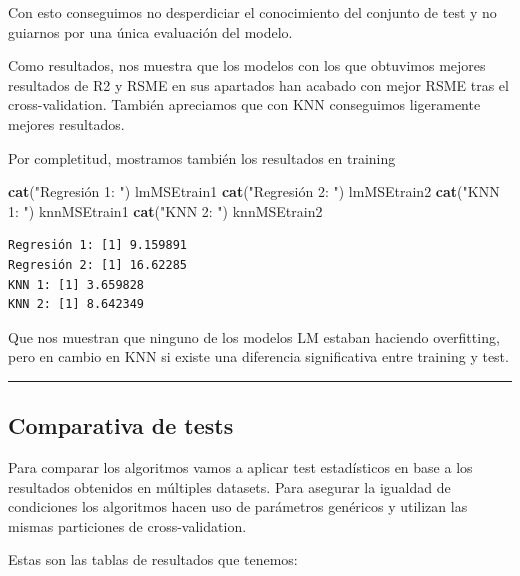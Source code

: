 \documentclass[
]{article}
\newenvironment{Shaded}{\begin{snugshade}}{\end{snugshade}}
\newcommand{\KeywordTok}[1]{\textcolor[rgb]{0.13,0.29,0.53}{\textbf{#1}}}
\newcommand{\NormalTok}[1]{#1}
\newcommand{\StringTok}[1]{\textcolor[rgb]{0.31,0.60,0.02}{#1}}
\begin{document}
Con esto conseguimos no desperdiciar el conocimiento del conjunto de
test y no guiarnos por una única evaluación del modelo.

Como resultados, nos muestra que los modelos con los que obtuvimos
mejores resultados de R2 y RSME en sus apartados han acabado con mejor
RSME tras el cross-validation. También apreciamos que con KNN
conseguimos ligeramente mejores resultados.

Por completitud, mostramos también los resultados en training

\begin{Shaded}
\begin{Highlighting}[]
\KeywordTok{cat}\NormalTok{(}\StringTok{"Regresión 1: "}\NormalTok{)}
\NormalTok{lmMSEtrain1}
\KeywordTok{cat}\NormalTok{(}\StringTok{"Regresión 2: "}\NormalTok{)}
\NormalTok{lmMSEtrain2}
\KeywordTok{cat}\NormalTok{(}\StringTok{"KNN 1: "}\NormalTok{)}
\NormalTok{knnMSEtrain1}
\KeywordTok{cat}\NormalTok{(}\StringTok{"KNN 2: "}\NormalTok{)}
\NormalTok{knnMSEtrain2}
\end{Highlighting}
\end{Shaded}

\begin{verbatim}
Regresión 1: [1] 9.159891
Regresión 2: [1] 16.62285
KNN 1: [1] 3.659828
KNN 2: [1] 8.642349
\end{verbatim}

Que nos muestran que ninguno de los modelos LM estaban haciendo
overfitting, pero en cambio en KNN si existe una diferencia
significativa entre training y test.

\begin{center}\rule{0.5\linewidth}{0.5pt}\end{center}

\hypertarget{comparativa-de-tests}{%
\subsection{Comparativa de tests}\label{comparativa-de-tests}}

Para comparar los algoritmos vamos a aplicar test estadísticos en base a
los resultados obtenidos en múltiples datasets. Para asegurar la
igualdad de condiciones los algoritmos hacen uso de parámetros genéricos
y utilizan las mismas particiones de cross-validation.

Estas son las tablas de resultados que tenemos:
\end{document}
